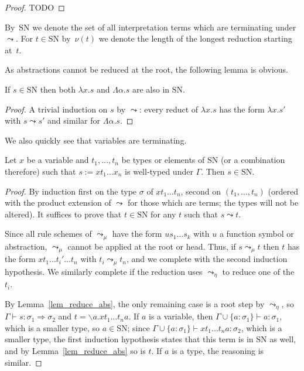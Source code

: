 \documentclass[runningheads,a4paper]{llncs}
\newcommand{\arrtype}{\Rightarrow}
\newcommand{\arreta}{\leadsto_\eta}
\newcommand{\arrnormalise}{\leadsto}
\newcommand{\normstep}{\leadsto_\mu}
\newcommand{\abs}[2]{\lambda #1.#2}
\newcommand{\tabs}[2]{\Lambda #1.#2}
\newcommand{\abstraction}[2]{\backslash #1.#2}
\newcommand{\SN}{\mathrm{SN}}
\newcommand{\proves}{\vdash}
\begin{document}
\begin{proof}
  TODO
\end{proof}

By~$\SN$ we denote the set of all interpretation terms which are
terminating under $\arrnormalise$. For $t \in \SN$ by~$\nu(t)$ we
denote the length of the longest reduction starting at~$t$.

As abstractions cannot be reduced at the root, the following lemma is
obvious.

\begin{lemma}\label{lem_reduce_abs}
If $s \in \SN$ then both $\abs{x}{s}$ and $\tabs{\alpha}{s}$ are also in
$\SN$.
\end{lemma}

\begin{proof}
A trivial induction on $s$ by $\arrnormalise$: every reduct of
$\abs{x}{s}$ has the form $\abs{x}{s'}$ with $s \arrnormalise s'$ and
similar for $\tabs{\alpha}{s}$.
\end{proof}

We also quickly see that variables are terminating.

\begin{lemma}\label{lem_var_sn}
Let $x$ be a variable and $t_1,\dots,t_n$ be types or elements of $\SN$
(or a combination therefore) such that $s := x t_1 \ldots x_n$ is
well-typed under $\Gamma$.  Then $s \in \SN$.
\end{lemma}

\begin{proof}
By induction first on the type $\sigma$ of $x t_1 \ldots t_n$, second
on $(t_1,\dots,t_n)$ (ordered with the product extension of
$\arrnormalise$ for those which are terms; the types will not be
altered).  It suffices to prove that $t \in \SN$ for any $t$ such that
$s \arrnormalise t$.

Since all rule schemes of $\normstep$ have the form $u s_1 \ldots s_k$
with $u$ a function symbol or abstraction, $\normstep$ cannot be applied
at the root or head.  Thus, if $s \normstep t$ then $t$ has the form $x
t_1 \ldots t_i' \ldots t_n$ with $t_i \normstep t_n$, and we complete
with the second induction hypothesis.  We similarly complete if the
reduction uses $\arreta$ to reduce one of the $t_i$.

By Lemma~\ref{lem_reduce_abs}, the only remaining case is a root step by
$\arreta$, so $\Gamma \proves s : \sigma_1 \arrtype \sigma_2$ and
$t = \abstraction{a}{x t_1 \ldots t_n a}$.
If $a$ is a variable, then $\Gamma \cup \{a : \sigma_1\} \proves a :
\sigma_1$, which is a smaller type, so $a \in \SN$; since $\Gamma \cup
\{a : \sigma_1\} \proves x t_1 \ldots t_n a : \sigma_2$, which is a
smaller type, the first induction hypothesis states that this term is
in $\SN$ as well, and by Lemma~\ref{lem_reduce_abs} so is $t$.
If $a$ is a type, the reasoning is similar.
\end{proof}
\end{document}
